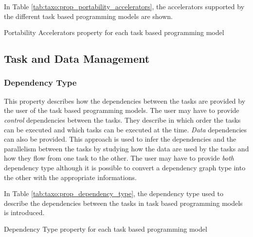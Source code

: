 In Table \ref{tab:taxo:prop_portability_accelerators}, the accelerators supported by the different task based programming models are shown.
\begin{table}[H]
	\caption{Portability Accelerators property for each task based programming model \label{tab:taxo:prop_portability_accelerators}}
	\centering
	\begin{multicols}{2}
		

		
	\end{multicols}
\end{table}

\subsection{Task and Data Management}
\subsubsection{Dependency Type}
This property describes how the dependencies between the tasks are provided by the user of the task based programming models.
The user may have to provide \textit{control} dependencies between the tasks.
They describe in which order the tasks can be executed and which tasks can be executed at the time.
\textit{Data} dependencies can also be provided.
This approach is used to infer the dependencies and the parallelism between the tasks by studying how the data are used by the tasks and how they flow from one task to the other.
The user may have to provide \textit{both} dependency type although it is possible to convert a dependency graph type into the other with the appropriate informations.

In Table \ref{tab:taxo:prop_dependency_type}, the dependency type used to describe the dependencies between the tasks in task based programming models is introduced.
\begin{table}[H]
	\caption{Dependency Type property for each task based programming model \label{tab:taxo:prop_dependency_type}}
	\centering
	\begin{multicols}{2}
		

		
	\end{multicols}
\end{table}

